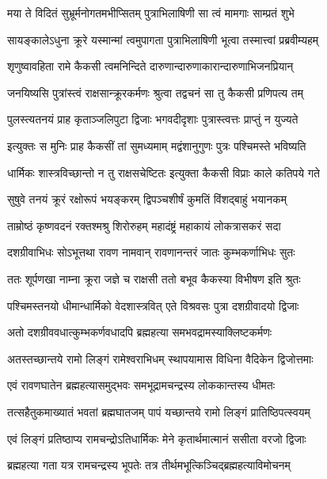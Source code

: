 \twolineshloka
{मया ते विदितं सुभ्रूर्मनोगतमभीप्सितम्}
{पुत्राभिलाषिणी सा त्वं मामगाः साम्प्रतं शुभे}%

\twolineshloka
{सायङ्कालेऽधुना क्रूरे यस्मान्मां त्वमुपागता}
{पुत्राभिलाषिणी भूत्वा तस्मात्त्वां प्रब्रवीम्यहम्}%

\twolineshloka
{शृणुष्वावहिता रामे कैकसी त्वमनिन्दिते}
{दारुणान्दारुणाकारान्दारुणाभिजनप्रियान्}%

\twolineshloka
{जनयिष्यसि पुत्रांस्त्वं राक्षसान्क्रूरकर्मणः}
{श्रुत्वा तद्वचनं सा तु कैकसी प्रणिपत्य तम्}%

\twolineshloka
{पुलस्त्यतनयं प्राह कृताञ्जलिपुटा द्विजाः}
{भगवदीदृशाः पुत्रास्त्वत्तः प्राप्तुं न युज्यते}%

\twolineshloka
{इत्युक्तः स मुनिः प्राह कैकसीं तां सुमध्यमाम्}
{मद्वंशानुगुणः पुत्रः पश्चिमस्ते भविष्यति}%

\twolineshloka
{धार्मिकः शास्त्रविच्छान्तो न तु राक्षसचेष्टितः}
{इत्युक्ता कैकसी विप्राः काले कतिपये गते}%

\twolineshloka
{सुषुवे तनयं क्रूरं रक्षोरूपं भयङ्करम्}
{द्विपञ्चशीर्षं कुमतिं विंशद्बाहुं भयानकम्}%

\twolineshloka
{ताम्रोष्ठं कृष्णवदनं रक्तश्मश्रु शिरोरुहम्}
{महादंष्ट्रं महाकायं लोकत्रासकरं सदा}%

\twolineshloka
{दशग्रीवाभिधः सोऽभूत्तथा रावण नामवान्}
{रावणानन्तरं जातः कुम्भकर्णाभिधः सुतः}%

\twolineshloka
{ततः शूर्पणखा नाम्ना क्रूरा जज्ञे च राक्षसी}
{ततो बभूव कैकस्या विभीषण इति श्रुतः}%

\twolineshloka
{पश्चिमस्तनयो धीमान्धार्मिको वेदशास्त्रवित्}
{एते विश्रवसः पुत्रा दशग्रीवादयो द्विजाः}%

\twolineshloka
{अतो दशग्रीववधात्कुम्भकर्णवधादपि}
{ब्रह्महत्या समभवद्रामस्याक्लिष्टकर्मणः}%

\twolineshloka
{अतस्तच्छान्तये रामो लिङ्गं रामेश्वराभिधम्}
{स्थापयामास विधिना वैदिकेन द्विजोत्तमाः}%

\twolineshloka
{एवं रावणघातेन ब्रह्महत्यासमुद्भवः}
{समभूद्रामचन्द्रस्य लोककान्तस्य धीमतः}%

\twolineshloka
{तत्सहैतुकमाख्यातं भवतां ब्रह्मघातजम्}
{पापं यच्छान्तये रामो लिङ्गं प्रातिष्ठिपत्स्वयम्}%

\twolineshloka
{एवं लिङ्गं प्रतिष्ठाप्य रामचन्द्रोऽतिधार्मिकः}
{मेने कृतार्थमात्मानं ससीता वरजो द्विजाः}%

\twolineshloka
{ब्रह्महत्या गता यत्र रामचन्द्रस्य भूपतेः}
{तत्र तीर्थमभूत्किञ्चिद्ब्रह्महत्याविमोचनम्}%


